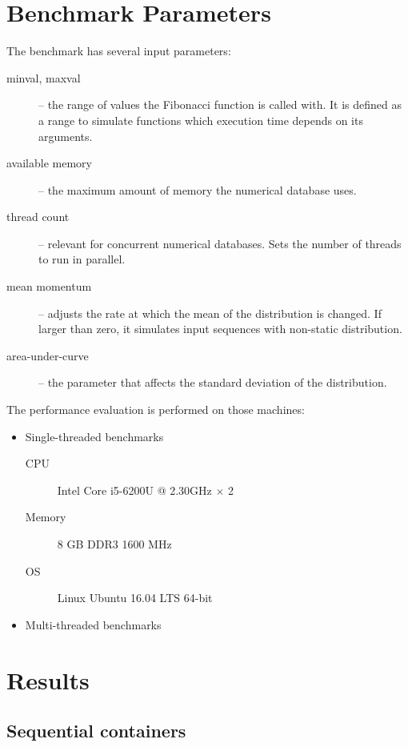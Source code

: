\section{Benchmark Parameters}
The benchmark has several input parameters:
\begin{description}
\item [minval, maxval]-- the range of values the Fibonacci function is called with. It is defined as a range to simulate functions which execution time depends on its arguments.
\item [available memory]-- the maximum amount of memory the numerical database uses.
\item [thread count]-- relevant for concurrent numerical databases. Sets the number of  threads to run in parallel.
\item[mean momentum]-- adjusts the rate at which the mean of the distribution is changed. If larger than zero, it simulates input sequences with non-static distribution.
\item[area-under-curve]-- the parameter that affects the standard deviation of the distribution.
\end{description}

The performance evaluation is performed on those machines:
\begin{itemize}
\item Single-threaded benchmarks
\begin{description}
\item [CPU] Intel\textsuperscript{\textregistered{}} Core\textsuperscript{\texttrademark{}} i5-6200U @ 2.30GHz $ \times $ 2
\item [Memory] 8 GB DDR3 1600 MHz
\item [OS] Linux\textsuperscript{\textregistered{}} Ubuntu\textsuperscript{\textregistered{}} 16.04 LTS 64-bit
\end{description}
\item Multi-threaded benchmarks

\end{itemize}


\section{Results}

\subsection{Sequential containers}
\label{sssec:seqbench}
